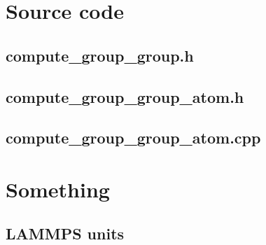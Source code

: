 \documentclass[twoside,english]{uiofysmaster}
\begin{document}





\appendix
\chapter{Source code}

\newpage
\section{compute\_group\_group.h}
\label{groupgrouph}


\newpage
\section{compute\_group\_group\_atom.h}



\newpage
\section{compute\_group\_group\_atom.cpp}



\chapter{Something}
\section{LAMMPS units}
\end{document}
